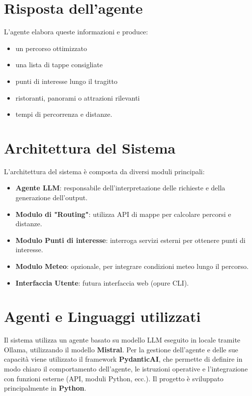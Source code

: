 \documentclass[12pt]{article}
\begin{document}
\section{Risposta dell'agente}
L'agente elabora queste informazioni e produce:
\begin{itemize}
    \item un percorso ottimizzato
    \item una lista di tappe consigliate
    \item punti di interesse lungo il tragitto
    \item ristoranti, panorami o attrazioni rilevanti
    \item tempi di percorrenza e distanze.
\end{itemize}

\section{Architettura del Sistema}
L'architettura del sistema è composta da diversi moduli principali:
\begin{itemize}
    \item \textbf{Agente LLM}: responsabile dell'interpretazione delle richieste e della generazione dell'output.
    \item \textbf{Modulo di "Routing"}: utilizza API di mappe per calcolare percorsi e distanze.
    \item \textbf{Modulo Punti di interesse}: interroga servizi esterni per ottenere punti di interesse.
    \item \textbf{Modulo Meteo}: opzionale, per integrare condizioni meteo lungo il percorso.
    \item \textbf{Interfaccia Utente}: futura interfaccia web (opure CLI).
\end{itemize}

\section{Agenti e Linguaggi utilizzati}

Il sistema utilizza un agente basato su modello LLM eseguito in locale tramite Ollama, utilizzando il modello \textbf{Mistral}.
\newline
Per la gestione dell'agente e delle sue capacità viene utilizzato il framework \textbf{PydanticAI}, che permette di definire in modo chiaro il comportamento dell'agente, le istruzioni operative e l'integrazione con funzioni esterne (API, moduli Python, ecc.).
\newline
Il progetto è sviluppato principalmente in \textbf{Python}.
\end{document}
